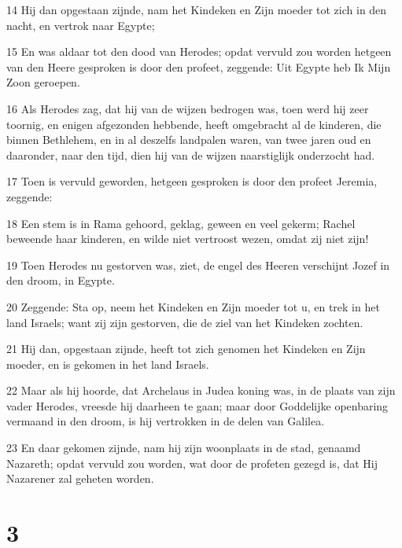 \par 14 Hij dan opgestaan zijnde, nam het Kindeken en Zijn moeder tot zich in den nacht, en vertrok naar Egypte;
\par 15 En was aldaar tot den dood van Herodes; opdat vervuld zou worden hetgeen van den Heere gesproken is door den profeet, zeggende: Uit Egypte heb Ik Mijn Zoon geroepen.
\par 16 Als Herodes zag, dat hij van de wijzen bedrogen was, toen werd hij zeer toornig, en enigen afgezonden hebbende, heeft omgebracht al de kinderen, die binnen Bethlehem, en in al deszelfs landpalen waren, van twee jaren oud en daaronder, naar den tijd, dien hij van de wijzen naarstiglijk onderzocht had.
\par 17 Toen is vervuld geworden, hetgeen gesproken is door den profeet Jeremia, zeggende:
\par 18 Een stem is in Rama gehoord, geklag, geween en veel gekerm; Rachel beweende haar kinderen, en wilde niet vertroost wezen, omdat zij niet zijn!
\par 19 Toen Herodes nu gestorven was, ziet, de engel des Heeren verschijnt Jozef in den droom, in Egypte.
\par 20 Zeggende: Sta op, neem het Kindeken en Zijn moeder tot u, en trek in het land Israels; want zij zijn gestorven, die de ziel van het Kindeken zochten.
\par 21 Hij dan, opgestaan zijnde, heeft tot zich genomen het Kindeken en Zijn moeder, en is gekomen in het land Israels.
\par 22 Maar als hij hoorde, dat Archelaus in Judea koning was, in de plaats van zijn vader Herodes, vreesde hij daarheen te gaan; maar door Goddelijke openbaring vermaand in den droom, is hij vertrokken in de delen van Galilea.
\par 23 En daar gekomen zijnde, nam hij zijn woonplaats in de stad, genaamd Nazareth; opdat vervuld zou worden, wat door de profeten gezegd is, dat Hij Nazarener zal geheten worden.

\chapter{3}

